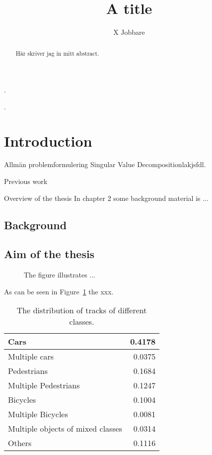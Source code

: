 \documentclass[a4paper]{article}
\title{A title}
\author{X Jobbare}
\def\svd {Singular Value Decomposition}
\begin{document}
\maketitle

\begin{abstract}
Här skriver jag in mitt abstract.
\end{abstract}

\pagebreak
.
\pagebreak

\tableofcontents

\pagebreak
.
\pagebreak

\section{Introduction}

Allmän problemformulering \svd lakjsfdl.

Previous work

Overview of the thesis
In chapter 2 some background material is ...


\subsection{Background}

\subsection{Aim of the thesis}

\begin{figure}
\begin{center}
\caption{The figure illustrates ...}
\label{f_traffic}
\end{center}
\end{figure}


As can be seen in Figure~\ref{f_traffic} the xxx.

\begin{table}[htbp]
  \begin{center}
    \begin{tabular}{|l|r|}
      \hline
      Cars & 0.4178 \\
      \hline
      Multiple cars & 0.0375 \\
      Pedestrians & 0.1684 \\
      Multiple Pedestrians & 0.1247 \\
      Bicycles & 0.1004 \\
      Multiple Bicycles & 0.0081 \\
      Multiple objects of mixed classes & 0.0314 \\
      Others & 0.1116 \\
      \hline
    \end{tabular}
    \caption{The distribution of tracks of different classes.}
    \label{t_class_hist}
  \end{center}
\end{table}
\end{document}
